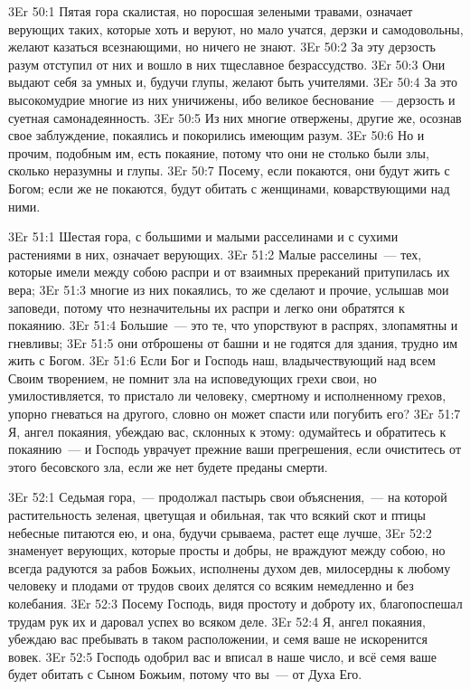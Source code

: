 \vs 3Er 50:1
Пятая гора скалистая, но
поросшая зелеными травами, означает верующих таких, которые хоть и веруют, но
мало учатся, дерзки и самодовольны, желают казаться всезнающими, но ничего не
знают.
\vs 3Er 50:2
За эту дерзость разум
отступил от них и вошло в них тщеславное безрассудство.
\vs 3Er 50:3
Они выдают себя за умных
и, будучи глупы, желают быть учителями.
\vs 3Er 50:4
За это высокомудрие многие
из них уничижены, ибо великое беснование~--- дерзость и суетная самонадеянность.
\vs 3Er 50:5
Из них многие отвержены,
другие же, осознав свое заблуждение, покаялись и покорились имеющим разум.
\vs 3Er 50:6
Но и прочим, подобным им,
есть покаяние, потому что они не столько были злы, сколько неразумны и глупы.
\vs 3Er 50:7
Посему, если покаются, они
будут жить с Богом; если же не покаются, будут обитать с женщинами,
коварствующими над ними.

\vs 3Er 51:1
Шестая гора, с большими и
малыми расселинами и с сухими растениями в них, означает верующих.
\vs 3Er 51:2
Малые расселины~--- тех,
которые имели между собою распри и от взаимных пререканий притупилась их вера;
\vs 3Er 51:3
многие из них покаялись,
то же сделают и прочие, услышав мои заповеди, потому что незначительны их
распри и легко они обратятся к покаянию.
\vs 3Er 51:4
Большие~--- это те, что
упорствуют в распрях, злопамятны и гневливы;
\vs 3Er 51:5
они отброшены от башни и
не годятся для здания, трудно им жить с Богом.
\vs 3Er 51:6
Если Бог и Господь наш,
владычествующий над всем Своим творением, не помнит зла на исповедующих грехи
свои, но умилостивляется, то пристало ли человеку, смертному и исполненному
грехов, упорно гневаться на другого, словно он может спасти или погубить его?
\vs 3Er 51:7
Я, ангел покаяния, убеждаю
вас, склонных к этому: одумайтесь и обратитесь к покаянию~--- и Господь уврачует
прежние ваши прегрешения, если очиститесь от этого бесовского зла, если же нет
будете преданы смерти.

\vs 3Er 52:1
Седьмая гора,~--- продолжал
пастырь свои объяснения,~--- на которой растительность зеленая, цветущая и
обильная, так что всякий скот и птицы небесные питаются ею, и она, будучи
срываема, растет еще лучше,
\vs 3Er 52:2
знаменует верующих,
которые просты и добры, не враждуют между собою, но всегда радуются за рабов
Божьих, исполнены духом дев, милосердны к любому человеку и плодами от трудов
своих делятся со всяким немедленно и без колебания.
\vs 3Er 52:3
Посему Господь, видя
простоту и доброту их, благопоспешал трудам рук их и даровал успех во всяком
деле.
\vs 3Er 52:4
Я, ангел покаяния,
убеждаю вас пребывать в таком расположении, и семя ваше не искоренится вовек.
\vs 3Er 52:5
Господь одобрил вас и
вписал в наше число, и всё семя ваше будет обитать с Сыном Божьим, потому что
вы~--- от Духа Его.

